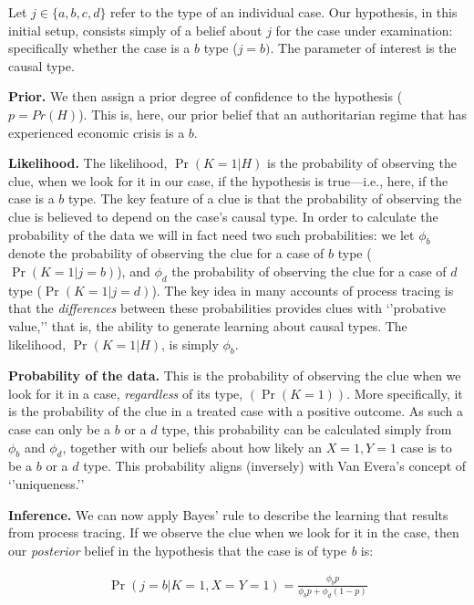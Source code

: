 \documentclass[12pt,]{book}
\begin{document}
Let \(j\in \{a,b,c,d\}\) refer to the type of an individual case. Our hypothesis, in this initial setup, consists simply of a belief about \(j\) for the case under examination: specifically whether the case is a \(b\) type (\(j=b)\). The parameter of interest is the causal type.

\textbf{Prior.} We then assign a prior degree of confidence to the hypothesis (\(p = Pr(H)\)). This is, here, our prior belief that an authoritarian regime that has experienced economic crisis is a \(b\).

\textbf{Likelihood.} The likelihood, \(\Pr(K=1|H)\) is the probability of observing the clue, when we look for it in our case, if the hypothesis is true---i.e., here, if the case is a \(b\) type. The key feature of a clue is that the probability of observing the clue is believed to depend on the case's causal type. In order to calculate the probability of the data we will in fact need two such probabilities: we let \(\phi_b\) denote the probability of observing the clue for a case of \(b\) type (\(\Pr(K=1|j=b)\)), and \(\phi_d\) the probability of observing the clue for a case of \(d\) type (\(\Pr(K=1|j=d)\)). The key idea in many accounts of process tracing is that the \emph{differences} between these probabilities provides clues with `'probative value,'' that is, the ability to generate learning about causal types. The likelihood, \(\Pr(K=1|H)\), is simply \(\phi_b\).

\textbf{Probability of the data.} This is the probability of observing the clue when we look for it in a case, \emph{regardless} of its type, \((\Pr(K=1))\). More specifically, it is the probability of the clue in a treated case with a positive outcome. As such a case can only be a \(b\) or a \(d\) type, this probability can be calculated simply from \(\phi_b\) and \(\phi_d\), together with our beliefs about how likely an \(X=1, Y=1\) case is to be a \(b\) or a \(d\) type.
This probability aligns (inversely) with Van Evera's concept of `'uniqueness.''

\textbf{Inference.} We can now apply Bayes' rule to describe the learning that results from process tracing. If we observe the clue when we look for it in the case, then our \emph{posterior} belief in the hypothesis that the case is of type \emph{b} is:

\begin{eqnarray*}
\Pr(j = b |K=1, X=Y=1)=  \frac{\phi_b p }{\phi_b p+\phi_d (1-p)}
\end{eqnarray*}
\end{document}
